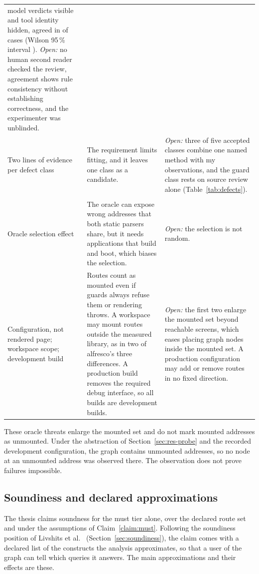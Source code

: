 \begin{xltabular}{\textwidth}{@{}>{\raggedright\arraybackslash}p{2.4cm}YY@{}}
model verdicts visible and tool identity hidden, agreed in \HHAuthorAgree{} of \HHAuthorJudged{}
cases (Wilson 95\,\% interval \HHAuthorAgreeRange{}). \emph{Open:} no human second reader checked
the review, agreement shows rule consistency without establishing correctness, and the experimenter
was unblinded. \\
Two lines of evidence per defect class
& The requirement limits fitting, and it leaves one class as a candidate.
& \emph{Open:} three of five accepted classes combine one named method with my observations, and the
guard class rests on source review alone (Table~\ref{tab:defects}). \\
\addlinespace[2pt]
\\
\addlinespace[2pt]
Oracle selection effect
& The oracle can expose wrong addresses that both static parsers share, but it needs applications
that build and boot, which biases the selection.
& \emph{Open:} the selection is not random. \\
Configuration, not rendered page; workspace scope; development build
& Routes count as mounted even if guards always refuse them or rendering throws. A workspace may
mount routes outside the measured library, as in two of alfresco's three differences. A production
build removes the required debug interface, so all builds are development builds.
& \emph{Open:} the first two enlarge the mounted set beyond reachable screens, which eases
placing graph nodes inside the mounted set. A production configuration may add or remove routes in no fixed direction. \\
\end{xltabular}
\endgroup

These oracle threats enlarge the mounted set and do not mark mounted addresses as unmounted. Under
the abstraction of Section~\ref{sec:res-probe} and the recorded development configuration, the
graph contains \ProbeInvented{} unmounted addresses, so no node at an unmounted address was observed there.
The observation does not prove failures impossible.

\subsection{Soundiness and declared approximations}
\label{sec:approximations}

The thesis claims soundness for the must tier alone, over the declared route set and under the
assumptions of Claim~\ref{claim:must}. Following the soundiness position of Livshits et
al.\ \cite{livshits2015soundiness} (Section~\ref{sec:soundiness}), the claim comes with a declared
list of the constructs the analysis approximates, so that a user of the graph can tell which
queries it answers. The main approximations and their effects are these.

